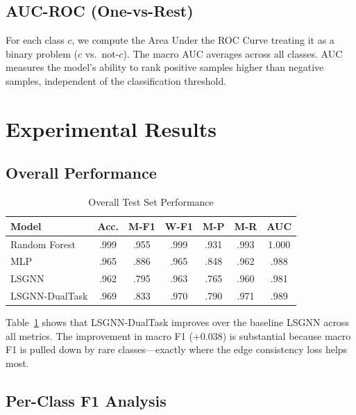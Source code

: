 \documentclass[conference]{IEEEtran}
\begin{document}
\subsection{AUC-ROC (One-vs-Rest)}

For each class $c$, we compute the Area Under the ROC Curve treating it as a binary problem ($c$ vs.\ not-$c$). The macro AUC averages across all classes. AUC measures the model's ability to rank positive samples higher than negative samples, independent of the classification threshold.

\section{Experimental Results}
\label{sec:results}

\subsection{Overall Performance}

\begin{table}[t]
\centering
\caption{Overall Test Set Performance}
\label{tab:main_results}
\begin{tabular}{@{}lcccccc@{}}
\toprule
\textbf{Model} & \textbf{Acc.} & \textbf{M-F1} & \textbf{W-F1} & \textbf{M-P} & \textbf{M-R} & \textbf{AUC} \\
\midrule
Random Forest  & .999 & .955 & .999 & .931 & .993 & 1.000 \\
MLP            & .965 & .886 & .965 & .848 & .962 & .988 \\
LSGNN          & .962 & .795 & .963 & .765 & .960 & .981 \\
LSGNN-DualTask & .969 & .833 & .970 & .790 & .971 & .989 \\
\bottomrule
\end{tabular}
\end{table}

Table~\ref{tab:main_results} shows that LSGNN-DualTask improves over the baseline LSGNN across all metrics. The improvement in macro F1 (+0.038) is substantial because macro F1 is pulled down by rare classes---exactly where the edge consistency loss helps most.

\subsection{Per-Class F1 Analysis}
\end{document}
